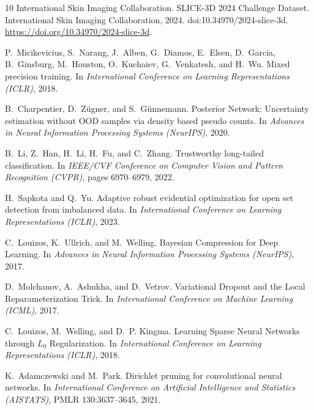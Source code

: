 \documentclass[letterpaper]{article}
\begin{document}
\begin{thebibliography}{10}
International Skin Imaging Collaboration.
\newblock SLICE-3D 2024 Challenge Dataset.
\newblock International Skin Imaging Collaboration, 2024.
\newblock doi:10.34970/2024-slice-3d.
\newblock \url{https://doi.org/10.34970/2024-slice-3d}.

P.~Micikevicius, S.~Narang, J.~Alben, G.~Diamos, E.~Elsen, D.~Garcia, B.~Ginsburg, M.~Houston, O.~Kuchaiev, G.~Venkatesh, and H.~Wu.
\newblock Mixed precision training.
\newblock In {\em International Conference on Learning Representations (ICLR)}, 2018.

B.~Charpentier, D.~Z{\"u}gner, and S.~G{\"u}nnemann.
\newblock Posterior Network: Uncertainty estimation without OOD samples via density based pseudo counts.
\newblock In {\em Advances in Neural Information Processing Systems (NeurIPS)}, 2020.


B.~Li, Z.~Han, H.~Li, H.~Fu, and C.~Zhang.
\newblock Trustworthy long-tailed classification.
\newblock In {\em IEEE/CVF Conference on Computer Vision and Pattern Recognition (CVPR)}, pages 6970--6979, 2022.

H.~Sapkota and Q.~Yu.
\newblock Adaptive robust evidential optimization for open set detection from imbalanced data.
\newblock In {\em International Conference on Learning Representations (ICLR)}, 2023.

C.~Louizos, K.~Ullrich, and M.~Welling.
\newblock Bayesian Compression for Deep Learning.
\newblock In {\em Advances in Neural Information Processing Systems (NeurIPS)}, 2017.

D.~Molchanov, A.~Ashukha, and D.~Vetrov.
\newblock Variational Dropout and the Local Reparameterization Trick.
\newblock In {\em International Conference on Machine Learning (ICML)}, 2017.

C.~Louizos, M.~Welling, and D.~P. Kingma.
\newblock Learning Sparse Neural Networks through $L_0$ Regularization.
\newblock In {\em International Conference on Learning Representations (ICLR)}, 2018.

K.~Adamczewski and M.~Park.
\newblock Dirichlet pruning for convolutional neural networks.
\newblock In {\em International Conference on Artificial Intelligence and Statistics (AISTATS)}, PMLR 130:3637--3645, 2021.


\end{thebibliography}
\end{document}
